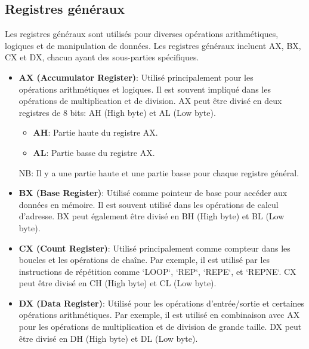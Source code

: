 \documentclass[a4paper, 12pt]{report}
\begin{document}
\subsection{Registres généraux}
Les registres généraux sont utilisés pour diverses opérations arithmétiques, logiques et de manipulation de données. Les registres généraux incluent AX, BX, CX et DX, chacun ayant des sous-parties spécifiques.

\begin{itemize}
  \item \textbf{AX (Accumulator Register)}: Utilisé principalement pour les \\opérations arithmétiques et logiques. Il est souvent impliqué dans les opérations de multiplication et de division. AX peut être divisé en deux registres de 8 bits: AH (High byte) et AL (Low byte).
    \begin{itemize}
      \item \textbf{AH}: Partie haute du registre AX. 
      \item \textbf{AL}: Partie basse du registre AX.
    \end{itemize}
    NB: Il y a une partie haute et une partie basse pour chaque registre général.
  \item \textbf{BX (Base Register)}: Utilisé comme pointeur de base pour accéder aux données en mémoire. Il est souvent utilisé dans les opérations de calcul d'adresse. BX peut également être divisé en BH (High byte) et BL (Low byte).
  \item \textbf{CX (Count Register)}: Utilisé principalement comme compteur dans les boucles et les opérations de chaîne. Par exemple, il est utilisé par les instructions de répétition comme `LOOP`, `REP`, `REPE`, et `REPNE`. CX peut être divisé en CH (High byte) et CL (Low byte).
  \item \textbf{DX (Data Register)}: Utilisé pour les opérations d'entrée/sortie et certaines opérations arithmétiques. Par exemple, il est utilisé en combinaison avec AX pour les opérations de multiplication et de division de grande taille. DX peut être divisé en DH (High byte) et DL (Low byte).
\end{itemize}
\end{document}
